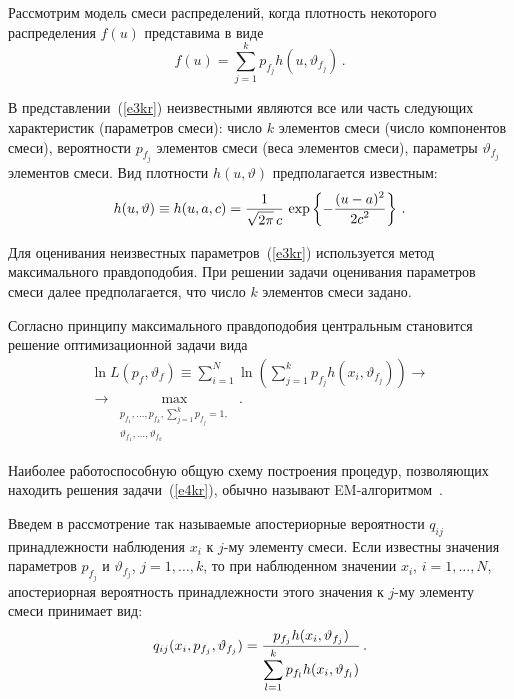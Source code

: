 \begin{multicols}{2}
     Рассмотрим модель смеси распределений, когда плотность некоторого 
распределения $f(u)$ представима в виде 
     \begin{equation}
     f(u) = \sum\limits_{j=1}^k p_{f_j} h\left ( u,\vartheta_{f_j}\right )\,.
     \label{e3kr}
     \end{equation}
     
     В представлении~(\ref{e3kr}) неизвестными являются все или часть 
следующих характеристик (параметров смеси): число $k$ элементов смеси (число 
компонентов смеси), вероятности $p_{f_j}$ элементов смеси (веса элементов 
смеси), параметры $\vartheta_{f_j}$ элементов смеси. Вид плотности 
     $h(u,\vartheta )$ предполагается известным: 
     $$
     h(u,\vartheta ) \equiv h(u,a,c)=\displaystyle\frac{\displaystyle 1\mathstrut}{\displaystyle \sqrt{2\pi}\,c\mathstrut}\,\exp\left \{ -\displaystyle\frac{\displaystyle (u-
a)^2\mathstrut}{\displaystyle 2c^2\mathstrut}\right \}\,.
     $$
     
     Для оценивания неизвестных параметров~(\ref{e3kr}) используется 
метод максимального правдоподобия. При решении задачи оценивания 
параметров смеси далее предполагается, что число $k$ элементов смеси задано.
     
     Согласно принципу максимального правдоподобия центральным 
становится решение оптимизационной задачи вида
     \begin{multline}
     \ln L(p_f,\vartheta_f )\equiv  \sum\limits_{i=1}^N \ln \left (
     \sum\limits_{j=1}^k p_{f_j}h\left ( x_i,\vartheta_{f_j}\right )\right )\rightarrow{}\\
     {}\rightarrow
     \underset{\substack{{p_{f_1},\ldots , p_{f_k}, \sum\limits_{j=1}^k p_{f_j} 
=1,}\\{\vartheta_{f_1},\ldots , \vartheta_{f_k}} }}{\max}\,.
     \label{e4kr}
     \end{multline}

Наиболее работоспособную общую схему построения процедур, позволяющих 
находить решения задачи~(\ref{e4kr}), обычно называют 
EM-ал\-го\-рит\-мом~\cite{2kr}.

     Введем в рассмотрение так называемые апостериорные вероятности 
$q_{ij}$ принадлежности наблюдения $x_i$ к $j$-му элементу смеси. Если 
известны значения параметров $p_{f_j}$ и $\vartheta_{f_j}$, $j=1,\ldots , k$, то 
при наблюденном значении $x_i$, $i=1,\ldots , N$, апостериорная вероятность 
принадлежности этого значения к  $j$-му элементу смеси принимает вид:
     \begin{equation}
     q_{ij} (x_i, p_{f_j}, \vartheta_{f_j}) = \displaystyle\frac{\displaystyle p_{f_j} h(x_i, 
\vartheta_{f_j})\mathstrut}{\displaystyle \sum\limits_{l=1}^k p_{f_l} h(x_i, \vartheta_{f_l})\mathstrut}\,.
     \label{e5kr}
     \end{equation}
     

\end{multicols}
